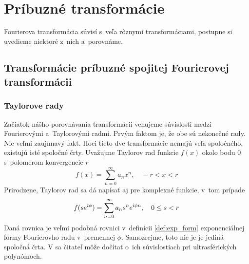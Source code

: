 \section{Príbuzné transformácie}

Fourierova transformácia súvisí s~veľa rôznymi transformáciami,
postupne si uvedieme niektoré z~nich a~porovnáme.

\subsection{Transformácie príbuzné spojitej Fourierovej transformácii}
\subsubsection{Taylorove rady}
Začiatok nášho porovnávania transformácii venujeme
súvislosti medzi Fourierovými a~Taylorovými radmi. Prvým faktom je, že
obe sú nekonečné rady. Nie veľmi zaujímavý fakt. Hoci tieto dve
transformácie nemajú veľa spoločného, existujú isté spoločné črty.
Uvažujme Taylorov rad funkcie $f(x)$ okolo bodu 0 s~polomerom konvergencie $r$
\begin{equation*}
    f(x) = \sum_{n=0}^{\infty} a_n x^n, \quad -r < x < r
\end{equation*}
Prirodzene, Taylorov rad sa dá napísať aj pre komplexné funkcie, v~tom
prípade
\begin{equation*}
    f(s e^{\hat{\imath} \phi}) = \sum_{n=0}^{\infty} a_n s^n e^{\hat{\imath} \phi n},
        \quad  0 \le s <r
\end{equation*}
Daná rovnica je veľmi podobná rovnici v~definícii \ref{def:exp_form} 
exponenciálnej formy Fourierovho radu v~premennej $\phi$.
Samozrejme, toto nie je je jediná spoločná črta. V \cite{taylor} sa
čitateľ môže dočítať o~ich súvislostiach pri ultrasférických
polynómoch.


